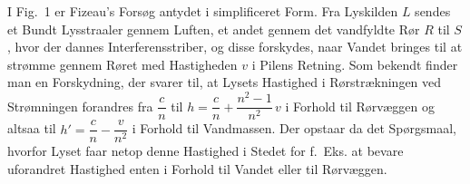 \documentclass[12pt,a4paper]{article}
\begin{document}
I Fig.~1 er Fizeau's Forsøg antydet i simplificeret Form. Fra Lyskilden $L$
sendes et Bundt Lysstraaler gennem Luften, et andet gennem det vandfyldte Rør
$R$ til $S$, hvor der dannes Interferensstriber, og disse forskydes, naar
Vandet bringes til at strømme gennem Røret med Hastigheden $v$ i Pilens
Retning. Som bekendt finder man en Forskydning, der svarer til, at Lysets
Hastighed i Rørstrækningen ved Strømningen forandres fra $\dfrac{c}{n}$ til
$h = \dfrac{c}{n} + \dfrac{n^{2}-1}{n^{2}}\,v$ i Forhold til Rørvæggen og
altsaa til $h' = \dfrac{c}{n} - \dfrac{v}{n^{2}}$ i Forhold til Vandmassen.
Der opstaar da det Spørgsmaal, hvorfor Lyset faar netop denne Hastighed i
Stedet for f.~Eks. at bevare uforandret Hastighed enten i Forhold til Vandet
eller til Rørvæggen.
\end{document}

